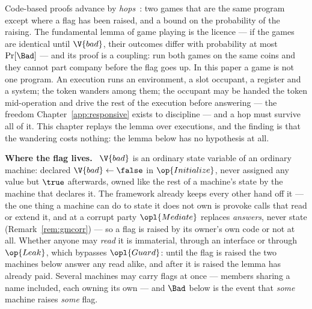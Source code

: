 \documentclass[10pt,oneside,openany]{book}
\newcommand{\heading}[1]{\medskip\par\noindent\textcolor{accent}{\textbf{#1.}}\ }
\theoremstyle{accentdef}
\theoremstyle{accentplain}
\begin{document}
Code-based proofs advance by \emph{hops}~\cite{BR06,Shoup04}: two games that are the same program
except where a flag has been raised, and a bound on the probability of the raising. The
fundamental lemma of game playing is the licence --- if the games are identical until $\V{bad}$,
their outcomes differ with probability at most $\Pr[\Bad]$ --- and its proof is a coupling: run
both games on the same coins and they cannot part company before the flag goes up. In this paper a
game is not one program. An execution runs an environment, a slot occupant, a register and a
system; the token wanders among them; the occupant may be handed the token mid-operation and
drive the rest of the execution before answering --- the freedom
Chapter~\ref{app:responsive} exists to discipline --- and a hop must survive all of it. This
chapter replays the lemma over executions, and the finding is that the wandering costs nothing:
the lemma below has no hypothesis at all.

\heading{Where the flag lives} $\V{bad}$ is an ordinary state variable of an ordinary machine:
declared $\V{bad} \gets \false$ in $\op{Initialize}$, never assigned any value but
$\true$ afterwards, owned like the rest of a machine's state by the machine that declares
it. The framework already keeps every other hand off it --- the one thing a machine can do to
state it does not own is provoke calls that read or extend it, and at a corrupt party
$\opl{Mediate}$ replaces \emph{answers}, never state (Remark~\ref{rem:gmcorr}) --- so a flag is
raised by its owner's own code or not at all. Whether anyone may \emph{read} it is immaterial,
through an interface or through $\op{Leak}$, which bypasses $\opl{Guard}$: until the flag is
raised the two machines below answer any read alike, and after it is raised the lemma has
already paid. Several machines may carry flags at once --- members sharing a name included, each
owning its own --- and $\Bad$ below is the event that \emph{some} machine raises \emph{some}
flag.
\end{document}
